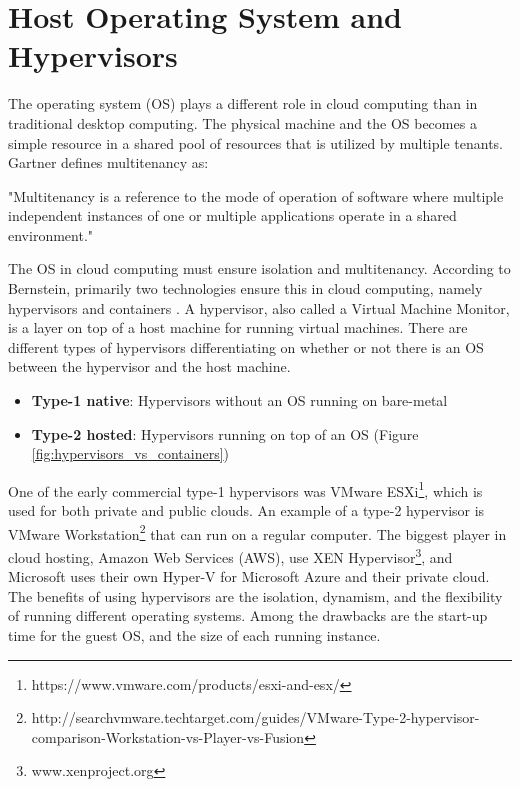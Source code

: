 \section{Host Operating System and Hypervisors}
\label{sec:role_of_os_and_hypervisors}
The operating system (OS) plays a different role in cloud computing than in traditional desktop computing. The physical machine and the OS becomes a simple resource in a shared pool of resources that is utilized by multiple tenants. Gartner defines multitenancy as:

\begin{definition} 
"Multitenancy is a reference to the mode of operation of software where multiple independent instances of one or multiple applications operate in a shared environment."
\end{definition}

\noindent
The OS in cloud computing must ensure isolation and multitenancy. According to Bernstein, primarily two technologies ensure this in cloud computing, namely hypervisors and containers \cite[p. 81]{bernstein2014containers}. 
A hypervisor, also called a Virtual Machine Monitor, is a layer on top of a host machine for running virtual machines. There are different types of hypervisors differentiating on whether or not there is an OS between the hypervisor and the host machine. 
\begin{itemize}
    \item \textbf{Type-1 native}: Hypervisors without an OS running on bare-metal
    \item \textbf{Type-2 hosted}: Hypervisors running on top of an OS (Figure \ref{fig:hypervisors_vs_containers})
\end{itemize}
\noindent
One of the early commercial type-1 hypervisors was VMware ESXi\footnote{https://www.vmware.com/products/esxi-and-esx/}, which is used for both private and public clouds. An example of a type-2 hypervisor is VMware Workstation\footnote{ http://searchvmware.techtarget.com/guides/VMware-Type-2-hypervisor-comparison-Workstation-vs-Player-vs-Fusion} that can run on a regular computer. The biggest player in cloud hosting, Amazon Web Services (AWS), use XEN Hypervisor\footnote{ www.xenproject.org}, and Microsoft uses their own Hyper-V for Microsoft Azure and their private cloud.
The benefits of using hypervisors are the isolation, dynamism, and the flexibility of running different operating systems. Among the drawbacks are the start-up time for the guest OS, and the size of each running instance. \\


